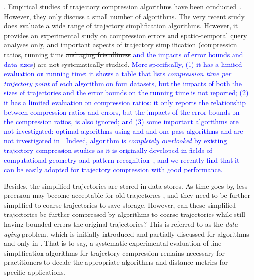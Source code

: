 {. Empirical studies of trajectory compression algorithms have been conducted~\cite{Muckell:Compression,MuckellHLR10,mThesis}. However, they only discuss a small number of algorithms. 
%
The very recent study \cite{Zhang:Evaluation} does evaluate a wide range of trajectory simplification algorithms.
However, it provides {an experimental study} on compression errors and spatio-temporal query analyses only, and important aspects of trajectory simplification (compression ratios, running time \sout{and aging friendliness} \textcolor{blue}{and the impacts of error bounds and data sizes}) are not systematically studied. 
\textcolor{blue}{More specifically, }
\textcolor{blue}{(1) it has a limited evaluation on running time: it shows a table that lists \emph{compression time per trajectory point} of each algorithm on four datasets, but the impacts of both the sizes of trajectories and the error bounds on the running time is not reported;}
%
\textcolor{blue}{(2) it has a limited evaluation on compression ratios: it only reports the relationship between compression ratios and errors, but the impacts of the error bounds on the compression ratios, is also ignored; and }
%
\textcolor{blue}{(3) some important algorithms are not investigated: optimal algorithms using \ped and \sed and one-pass algorithms \siped and \cised are not investigated in \cite{Zhang:Evaluation}. Indeed, algorithm \siped is {\em completely overlooked} by existing trajectory compression studies as it is originally developed in fields of computational geometry and pattern recognition~\cite{Williams:Longest,Sklansky:Cone,Dunham:Cone, Zhao:Sleeve}, and we recently find that it can be easily adopted for trajectory compression with good performance.}%

Besides, the simplified trajectories are stored in data stores. As time goes by, less precision may become acceptable for old trajectories \cite{Cao:Spatio}, and they need to be further simplified to coarse trajectories to save storage. However, can these simplified trajectories be further compressed by \lsa algorithms to coarse trajectories while still having bounded errors \wrt the original trajectories? This is referred to as the \emph{data aging} problem, which is initially introduced and partially discussed for algorithms \opt and \dpa only in \cite{Cao:Spatio}.
That is to say, a systematic experimental evaluation of line simplification algorithms for trajectory compression remains necessary for practitioners to decide the appropriate algorithms and distance metrics for specific applications.


}
